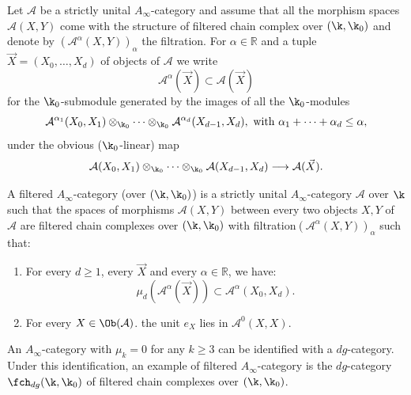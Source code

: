 Let $\mathcal{A}$ be a strictly unital $A_\infty$-category and assume that all the morphism spaces $\mathcal{A}(X,Y)$ come with the structure of filtered chain complex over $(\k,\k_0)$ and denote by $(\mathcal{A}^\alpha(X,Y))_\alpha$ the filtration. For $\alpha \in \mathbb{R}$ and a tuple
$\vec{X} = (X_0, \ldots, X_d)$ of objects of $\mathcal{A}$ we write
$$\mathcal{A}^\alpha(\vec{X}) \subset \mathcal{A}(\vec{X})$$ for the
$\k_0$-submodule generated by the images of all the $\k_0$-modules
$$\mathcal{A}^{\alpha_1}(X_0, X_1) \otimes_{\k_0} \cdots \otimes_{\k_0}
\mathcal{A}^{\alpha_d}(X_{d-1}, X_d), \text{ with } \alpha_1 + \cdots
+ \alpha_d \leq \alpha,$$ under the obvious ($\k_0$-linear) map
$$\mathcal{A}(X_0, X_1) \otimes_{\k_0} \cdots \otimes_{\k_0}
\mathcal{A}(X_{d-1}, X_d) \longrightarrow \mathcal{A}(\vec{X}).$$
\begin{dfn}
  A filtered $A_{\infty}$-category (over $(\k,\k_0)$) is a strictly unital
$A_{\infty}$-category $\mathcal{A}$ over $\k$ such that the spaces of
morphisms $\mathcal{A}(X, Y)$ between every
two objects $X, Y$ of $\mathcal{A}$ are filtered chain complexes over $(\k,\k_0)$ with filtration$(\mathcal{A}^\alpha(X,Y))_\alpha$ such that:
\begin{enumerate}
\item For every $d \geq 1$, every $\vec{X}$ and every
$\alpha \in \mathbb{R}$, we have:
$$\mu_d (\mathcal{A}^{\alpha}(\vec{X}))
\subset \mathcal{A}^{\alpha}(X_0, X_d).$$
\item For every $X\in \Ob(\mathcal{A})$. the unit $e_X$ lies in $\mathcal{A}^0(X,X)$.
\end{enumerate} 
\end{dfn}

\begin{remark}
  An $A_\infty$-category with $\mu_k=0$ for any $k\geq 3$ can be identified with a $dg$-category. Under this identification, an example of filtered $A_\infty$-category is the $dg$-category $\fch_{dg}(\k,\k_0)$ of filtered chain complexes over $(\k,\k_0)$.
\end{remark}




